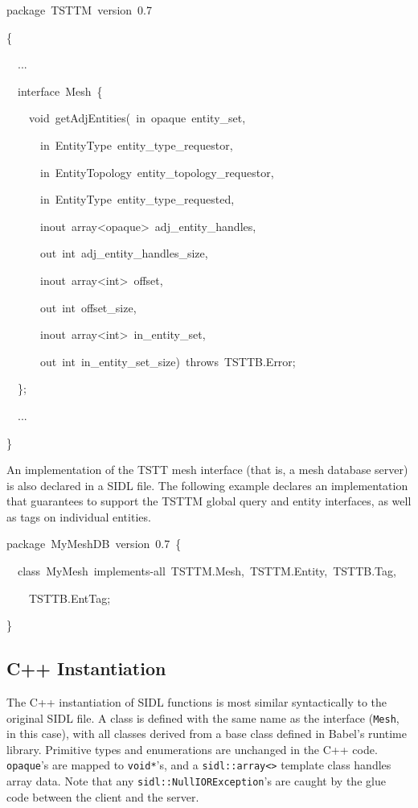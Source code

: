 \begin{lyxcode}
package~TSTTM~version~0.7

\{

~~...

~~interface~Mesh~\{

~~~~void~getAdjEntities(~in~opaque~entity\_set,

~~~~~~in~EntityType~entity\_type\_requestor,~

~~~~~~in~EntityTopology~entity\_topology\_requestor,

~~~~~~in~EntityType~entity\_type\_requested,

~~~~~~inout~array<opaque>~adj\_entity\_handles,

~~~~~~out~int~adj\_entity\_handles\_size,

~~~~~~inout~array<int>~offset,

~~~~~~out~int~offset\_size,

~~~~~~inout~array<int>~in\_entity\_set,

~~~~~~out~int~in\_entity\_set\_size)~throws~TSTTB.Error;

~~\};

~~...

\}
\end{lyxcode}
An implementation of the TSTT mesh interface (that is, a mesh database
server) is also declared in a SIDL file. The following example declares
an implementation that guarantees to support the TSTTM global query
and entity interfaces, as well as tags on individual entities.

\begin{lyxcode}
package~MyMeshDB~version~0.7~\{

~~class~MyMesh~implements-all~TSTTM.Mesh,~TSTTM.Entity,~TSTTB.Tag,

~~~~TSTTB.EntTag;

\}
\end{lyxcode}

\subsection*{C++ Instantiation}

The C++ instantiation of SIDL functions is most similar syntactically
to the original SIDL file. A class is defined with the same name as
the interface (\texttt{Mesh}, in this case), with all classes derived
from a base class defined in Babel's runtime library. Primitive types
and enumerations are unchanged in the C++ code. \texttt{opaque}'s
are mapped to \texttt{void{*}}'s, and a \texttt{sidl::array<>} template
class handles array data. Note that any \texttt{sidl::NullIORException}'s
are caught by the glue code between the client and the server.

